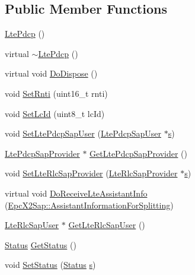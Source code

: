 \subsection*{Public Member Functions}
\begin{DoxyCompactItemize}
\item 
\hyperlink{classns3_1_1LtePdcp_afb2c1be7671c10d31fea213ff9c85fbb}{Lte\+Pdcp} ()
\item 
virtual \hyperlink{classns3_1_1LtePdcp_a5aad822ecc1b221fc7c6cbd6e3aba9b2}{$\sim$\+Lte\+Pdcp} ()
\item 
virtual void \hyperlink{classns3_1_1LtePdcp_a345b57655a5480309ba1c1568957cd9b}{Do\+Dispose} ()
\item 
void \hyperlink{classns3_1_1LtePdcp_a874630639e4201047100ac513a0ea55b}{Set\+Rnti} (uint16\+\_\+t rnti)
\item 
void \hyperlink{classns3_1_1LtePdcp_ae3ccb3ba9bf9b9f364ec4169932b43ca}{Set\+Lc\+Id} (uint8\+\_\+t lc\+Id)
\item 
void \hyperlink{classns3_1_1LtePdcp_a11a9cb433e01358dcd7245fdce3c40b9}{Set\+Lte\+Pdcp\+Sap\+User} (\hyperlink{classns3_1_1LtePdcpSapUser}{Lte\+Pdcp\+Sap\+User} $\ast$\hyperlink{generate__test__data__lte__sinr_8m_ad83eeb3a142285d1243a08c6b7026df8}{s})
\item 
\hyperlink{classns3_1_1LtePdcpSapProvider}{Lte\+Pdcp\+Sap\+Provider} $\ast$ \hyperlink{classns3_1_1LtePdcp_a3813a1ae784a3ba355f33201a30e8afb}{Get\+Lte\+Pdcp\+Sap\+Provider} ()
\item 
void \hyperlink{classns3_1_1LtePdcp_ac18c1a84da76efcb7e80b9c5a6f3524e}{Set\+Lte\+Rlc\+Sap\+Provider} (\hyperlink{classns3_1_1LteRlcSapProvider}{Lte\+Rlc\+Sap\+Provider} $\ast$\hyperlink{generate__test__data__lte__sinr_8m_ad83eeb3a142285d1243a08c6b7026df8}{s})
\item 
virtual void \hyperlink{classns3_1_1LtePdcp_aed5501cea8b70847813e9272694ed254}{Do\+Receive\+Lte\+Assistant\+Info} (\hyperlink{structns3_1_1EpcX2Sap_1_1AssistantInformationForSplitting}{Epc\+X2\+Sap\+::\+Assistant\+Information\+For\+Splitting})
\item 
\hyperlink{classns3_1_1LteRlcSapUser}{Lte\+Rlc\+Sap\+User} $\ast$ \hyperlink{classns3_1_1LtePdcp_a2cbfc3aad931f9cd7cf93f782d17c0c7}{Get\+Lte\+Rlc\+Sap\+User} ()
\item 
\hyperlink{structns3_1_1LtePdcp_1_1Status}{Status} \hyperlink{classns3_1_1LtePdcp_ad6932b973406e9594ac6c36f3044c4b9}{Get\+Status} ()
\item 
void \hyperlink{classns3_1_1LtePdcp_a523bf0ba17e1bd9346fd18ff424835bd}{Set\+Status} (\hyperlink{structns3_1_1LtePdcp_1_1Status}{Status} \hyperlink{generate__test__data__lte__sinr_8m_ad83eeb3a142285d1243a08c6b7026df8}{s})
\end{DoxyCompactItemize}

